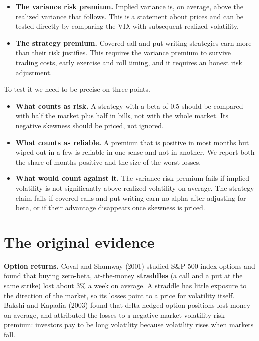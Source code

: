 \begin{itemize}
  \item \textbf{The variance risk premium.} Implied variance is, on average, above the realized variance that follows. This is a statement about prices and can be tested directly by comparing the VIX with subsequent realized volatility.
  \item \textbf{The strategy premium.} Covered-call and put-writing strategies earn more than their risk justifies. This requires the variance premium to survive trading costs, early exercise and roll timing, and it requires an honest risk adjustment.
\end{itemize}

To test it we need to be precise on three points.

\begin{itemize}
  \item \textbf{What counts as risk.} A strategy with a beta of 0.5 should be compared with half the market plus half in bills, not with the whole market. Its negative skewness should be priced, not ignored.
  \item \textbf{What counts as reliable.} A premium that is positive in most months but wiped out in a few is reliable in one sense and not in another. We report both the share of months positive and the size of the worst losses.
  \item \textbf{What would count against it.} The variance risk premium fails if implied volatility is not significantly above realized volatility on average. The strategy claim fails if covered calls and put-writing earn no alpha after adjusting for beta, or if their advantage disappears once skewness is priced.
\end{itemize}

\section{The original evidence}
\label{sec:14-evidence}

\textbf{Option returns.} Coval and Shumway (2001) studied S\&P 500 index options and found that buying zero-beta, at-the-money \textbf{straddles} (a call and a put at the same strike) lost about 3\% a week on average. A straddle has little exposure to the direction of the market, so its losses point to a price for volatility itself. Bakshi and Kapadia (2003) found that delta-hedged option positions lost money on average, and attributed the losses to a negative market volatility risk premium: investors pay to be long volatility because volatility rises when markets fall.

